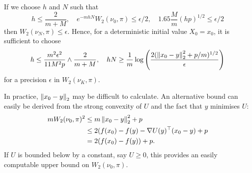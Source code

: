\begin{remark}
    If we choose $h$ and $N$ such that
    $$
    h \leq \frac{2}{m+M}, \quad e^{-mhN}W_2(\nu_0, \pi) \leq \epsilon/2, \quad 1.65\frac{M}{m}(hp)^{1/2} \leq \epsilon/2
    $$
    then $W_2(\nu_N,\pi) \leq \epsilon$.  Hence, for a deterministic initial value $X_0=x_0$, it is sufficient to choose
    $$
    h \leq \frac{m^2 \epsilon^2}{11M^2p} \wedge \frac{2}{m+M}, \quad hN \geq \frac{1}{m} \log \left( \frac{2(\norm{x_0-y}_2^2+p/m)^{1/2}}{\epsilon} \right)
    $$
    for a precision $\epsilon$ in $W_2(\nu_K, \pi)$.
\end{remark}

\begin{note}
    In practice, $\norm{x_0-y}_2$ may be difficult to calculate.  An alternative bound can easily be derived from the strong convexity of $U$ and the fact that $y$ minimises $U$:
    \begin{align*}
        m W_2(\nu_0, \pi)^2 &\leq m \norm{x_0-y}_2^2 + p\\
        &\leq 2(f(x_0) - f(y) - \nabla U(y)^{\top}(x_0-y) + p\\
        &= 2(f(x_0)-f(y))+p.
    \end{align*}
    If $U$ is bounded below by a constant, say $U \geq 0$, this provides an easily computable upper bound on $W_2(\nu_0, \pi)$.
\end{note}


